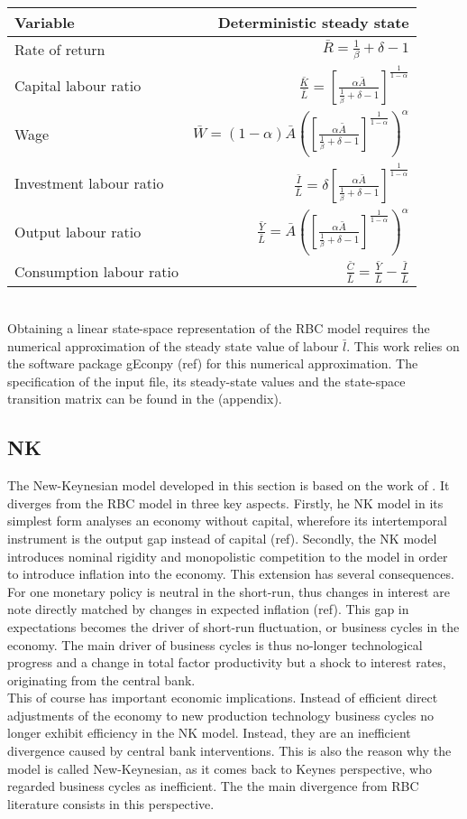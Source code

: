 \documentclass[12pt,a4paper,english]{article} %
\newcommand{\Rss}{\frac{1}{\beta} + \delta - 1}
\newcommand{\Ass}{\bar{A}}
\newcommand{\KLss}{\left[ \frac{\alpha \Ass}{\Rss} \right]^{\frac{1}{1-\alpha}}}
\begin{document}
	\begin{tabular}{lr}
		\textbf{Variable} & \textbf{Deterministic steady state}\\
		\hline 
		Rate of return & $\bar{R} = \Rss$ \\
		Capital labour ratio & $\frac{\bar{K}}{\bar{L}} = \KLss$ \\
		Wage & $\bar{W} = (1 - \alpha) \Ass \left(\KLss\right)^\alpha$ \\
		Investment labour ratio & $\frac{\bar{I}}{\bar{L}} = \delta \KLss$ \\
		Output labour ratio & $\frac{\bar{Y}}{\bar{L}} = \Ass \left(\KLss\right)^\alpha$ \\
		Consumption labour ratio & $\frac{\bar{C}}{\bar{L}} = \frac{\bar{Y}}{\bar{L}} - \frac{\bar{I}}{\bar{L}}$ \\
	\end{tabular}\\

	Obtaining a linear state-space representation of the RBC model requires the numerical approximation of the steady state value of labour $\bar{l}$. This work relies on the software package gEconpy (ref) for this numerical approximation. The specification of the input file, its steady-state values and the state-space transition matrix can be found in the (appendix). 

	
	
	
	
	

	
	

	
	
	\subsection{NK}
	The New-Keynesian model developed in this section is based on the work of \cite{gali_monetary_2008}. It diverges from the RBC model in three key aspects. Firstly, he NK model in its simplest form analyses an economy without capital, wherefore its intertemporal  instrument is the output gap instead of capital (ref). Secondly, the NK model introduces nominal rigidity and monopolistic competition to the model in order to introduce inflation into the economy. This extension has several consequences. For one monetary policy is neutral in the short-run, thus changes in interest are note directly matched by changes in expected inflation (ref). This gap in expectations becomes the driver of short-run fluctuation, or business cycles in the economy. The main driver of business cycles is thus no-longer technological progress and a change in total factor productivity but a shock to interest rates, originating from the central bank. \\
	This of course has important economic implications. Instead of efficient direct adjustments of the economy to new production technology business cycles no longer exhibit efficiency in the NK model. Instead, they are an inefficient divergence caused by central bank interventions. This is also the reason why the model is called New-Keynesian, as it comes back to Keynes perspective, who regarded business cycles as inefficient. The the main divergence from RBC literature consists in this perspective.
		
\end{document}
